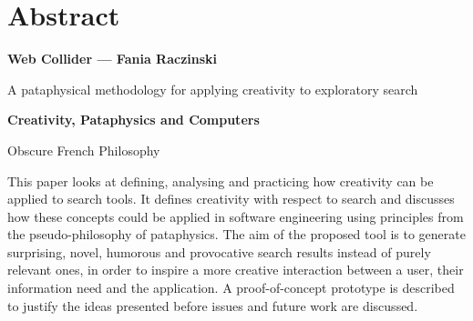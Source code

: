 
\pagestyle{empty}

\chapter{Abstract}
\label{abstract}

{\Large \textbf{Web Collider --- Fania Raczinski}}

\vspace{0.5cm}

A pataphysical methodology for applying creativity to exploratory search

\vspace{1cm}

{\Large \textbf{Creativity, Pataphysics and Computers}}

Obscure French Philosophy

This paper looks at defining, analysing and practicing how creativity can be applied to search tools. It defines creativity with respect to search and discusses how these concepts could be applied in software engineering using principles from the pseudo-philosophy of pataphysics. The aim of the proposed tool is to generate surprising, novel, humorous and provocative search results instead of purely relevant ones, in order to inspire a more creative interaction between a user, their information need and the application. A proof-of-concept prototype is described to justify the ideas presented before issues and future work are discussed.

\clearpage
